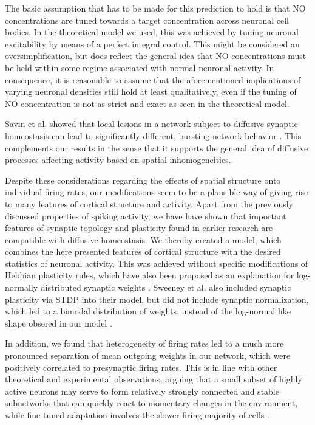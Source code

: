 \documentclass[10pt,letterpaper]{article}
\begin{document}
The basic assumption that has to be made for this prediction to hold is that NO concentrations are tuned towards a target concentration across neuronal cell bodies. In the theoretical model we used, this was achieved by tuning neuronal excitability by means of a perfect integral control. This might be considered an oversimplification, but does reflect the general idea that NO concentrations must be held within some regime associated with normal neuronal activity. In consequence, it is reasonable to assume that the aforementioned implications of varying neuronal densities still hold at least qualitatively, even if the tuning of NO concentration is not as strict and exact as seen in the theoretical model.

Savin et al. showed that local lesions in a network subject to diffusive synaptic homeostasis can lead to significantly different, bursting network behavior \cite{Savin_2008}. This complements our results in the sense that it supports the general idea of diffusive processes affecting activity based on spatial inhomogeneities.

Despite these considerations regarding the effects of spatial structure onto individual firing rates, our modifications seem to be a plausible way of giving rise to many features of cortical structure and activity. Apart from the previously discussed properties of spiking activity, we have have shown that important features of synaptic topology and plasticity found in earlier research are compatible with diffusive homeostasis. We thereby created a model, which combines the here presented features of cortical structure with the desired statistics of neuronal activity. This was achieved without specific modifications of Hebbian plasticity rules, which have also been proposed as an explanation for log-normally distributed synaptic weights \cite{Koulakov_2009,Gilson_2011,Effenberger_2015}. Sweeney et al. also included synaptic plasticity via STDP into their model, but did not include synaptic normalization, which led to a bimodal distribution of weights, instead of the log-normal like shape obsered in our model \cite{Sweeney_Paper}.

In addition, we found that heterogeneity of firing rates led to a much more pronounced separation of mean outgoing weights in our network, which were positively correlated to presynaptic firing rates. This is in line with other theoretical and experimental observations, arguing that a small subset of highly active neurons may serve to form relatively strongly connected and stable subnetworks that can quickly react to momentary changes in the environment, while fine tuned adaptation involves the slower firing majority of cells \cite{Buzsaki_Fir_Rates_2014,Yassin_Subnetworks_2010,Dragoi_2003}.
\end{document}
